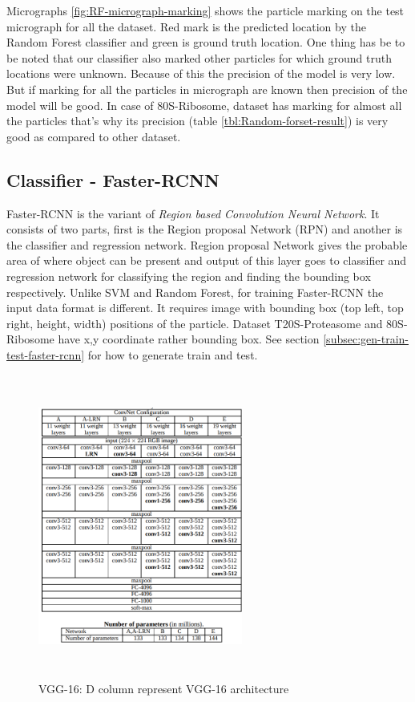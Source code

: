 \documentclass{report}
\begin{document}
Micrographs \ref{fig:RF-micrograph-marking} shows the particle marking on the test micrograph for all the dataset. Red mark is the predicted location by the Random Forest classifier and green is ground truth location. One thing has be to be noted that our classifier also marked other particles for which ground truth locations were unknown. Because of this the precision of the model is very low. But if marking for all the particles in micrograph are known then precision of the model will be good. In case of 80S-Ribosome, dataset has marking for almost all the particles that's why its precision (table \ref{tbl:Random-forset-result}) is very good as compared to other dataset.


\subsection{Classifier - Faster-RCNN}
Faster-RCNN is the variant of \textit{Region based Convolution Neural Network}. It consists of two parts, first is the Region proposal Network (RPN) and  another is the classifier and regression network. Region proposal Network gives the probable area of where object can be present and output of this layer goes to classifier and regression network for classifying the region and finding the bounding box respectively. Unlike SVM and Random Forest, for training Faster-RCNN the input data format is different. It requires image with bounding box (top left, top right, height, width) positions of the particle. Dataset T20S-Proteasome and 80S-Ribosome have x,y coordinate rather bounding box. See section \ref{subsec:gen-train-test-faster-rcnn} for how to generate train and test.

\begin{figure}[H]
\includegraphics[width=0.6\textwidth,height=10cm]{vgg16_arch.png}
\centering
\captionsetup{justification=centering}
\caption{VGG-16: D column represent VGG-16 architecture}
\label{fig:fastercnn-vgg16-arch}
\end{figure}
\end{document}
